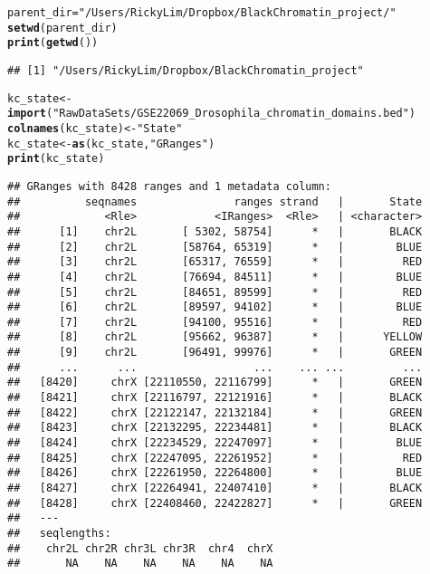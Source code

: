 \documentclass[11pt, oneside]{article}\usepackage{graphicx, color}
\makeatletter
\newcommand{\hlfunctioncall}[1]{\textcolor[rgb]{0.501960784313725,0,0.329411764705882}{\textbf{#1}}}%
\newcommand{\hlstring}[1]{\textcolor[rgb]{0.6,0.6,1}{#1}}%
\newenvironment{kframe}{%
 \def\at@end@of@kframe{}%
 \ifinner\ifhmode%
  \def\at@end@of@kframe{\end{minipage}}%
  \begin{minipage}{\columnwidth}%
 \fi\fi%
 \def\FrameCommand##1{\hskip\@totalleftmargin \hskip-\fboxsep
 \colorbox{shadecolor}{##1}\hskip-\fboxsep
     \hskip-\linewidth \hskip-\@totalleftmargin \hskip\columnwidth}%
 \MakeFramed {\advance\hsize-\width
   \@totalleftmargin\z@ \linewidth\hsize
   \@setminipage}}%
 {\par\unskip\endMakeFramed%
 \at@end@of@kframe}
\newenvironment{knitrout}{}{} %
\makeatother
\begin{document}
\begin{knitrout}
\begin{kframe}
{\ttfamily\noindent\itshape\color{messagecolor}{\#\# Loading required package: IRanges}}

{\ttfamily\noindent\color{warningcolor}{\#\# Warning: package 'IRanges' was built under R version 2.15.2}}\begin{alltt}
parent_dir = \hlstring{"/Users/RickyLim/Dropbox/BlackChromatin_project/"}
\hlfunctioncall{setwd}(parent_dir)
\hlfunctioncall{print}(\hlfunctioncall{getwd}())
\end{alltt}
\begin{verbatim}
## [1] "/Users/RickyLim/Dropbox/BlackChromatin_project"
\end{verbatim}
\begin{alltt}
kc_state <- \hlfunctioncall{import}(\hlstring{"RawDataSets/GSE22069_Drosophila_chromatin_domains.bed"})
\hlfunctioncall{colnames}(kc_state) <- \hlstring{"State"}
kc_state <- \hlfunctioncall{as}(kc_state, \hlstring{"GRanges"})
\hlfunctioncall{print}(kc_state)
\end{alltt}
\begin{verbatim}
## GRanges with 8428 ranges and 1 metadata column:
##          seqnames               ranges strand   |       State
##             <Rle>            <IRanges>  <Rle>   | <character>
##      [1]    chr2L       [ 5302, 58754]      *   |       BLACK
##      [2]    chr2L       [58764, 65319]      *   |        BLUE
##      [3]    chr2L       [65317, 76559]      *   |         RED
##      [4]    chr2L       [76694, 84511]      *   |        BLUE
##      [5]    chr2L       [84651, 89599]      *   |         RED
##      [6]    chr2L       [89597, 94102]      *   |        BLUE
##      [7]    chr2L       [94100, 95516]      *   |         RED
##      [8]    chr2L       [95662, 96387]      *   |      YELLOW
##      [9]    chr2L       [96491, 99976]      *   |       GREEN
##      ...      ...                  ...    ... ...         ...
##   [8420]     chrX [22110550, 22116799]      *   |       GREEN
##   [8421]     chrX [22116797, 22121916]      *   |       BLACK
##   [8422]     chrX [22122147, 22132184]      *   |       GREEN
##   [8423]     chrX [22132295, 22234481]      *   |       BLACK
##   [8424]     chrX [22234529, 22247097]      *   |        BLUE
##   [8425]     chrX [22247095, 22261952]      *   |         RED
##   [8426]     chrX [22261950, 22264800]      *   |        BLUE
##   [8427]     chrX [22264941, 22407410]      *   |       BLACK
##   [8428]     chrX [22408460, 22422827]      *   |       GREEN
##   ---
##   seqlengths:
##    chr2L chr2R chr3L chr3R  chr4  chrX
##       NA    NA    NA    NA    NA    NA
\end{verbatim}
\end{kframe}
\end{knitrout}
\end{document}
